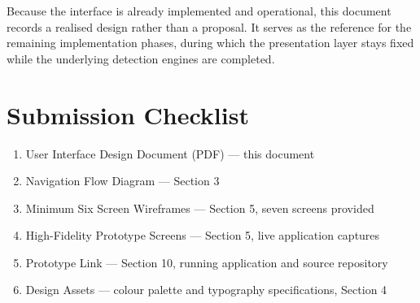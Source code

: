 \documentclass[12pt,a4paper,twoside]{article}
\begin{document}
Because the interface is already implemented and operational, this document records a
realised design rather than a proposal. It serves as the reference for the remaining
implementation phases, during which the presentation layer stays fixed while the
underlying detection engines are completed.

\section{Submission Checklist}

\begin{enumerate}
\item User Interface Design Document (PDF) --- this document
\item Navigation Flow Diagram --- Section 3
\item Minimum Six Screen Wireframes --- Section 5, seven screens provided
\item High-Fidelity Prototype Screens --- Section 5, live application captures
\item Prototype Link --- Section 10, running application and source repository
\item Design Assets --- colour palette and typography specifications, Section 4
\end{enumerate}
\end{document}
